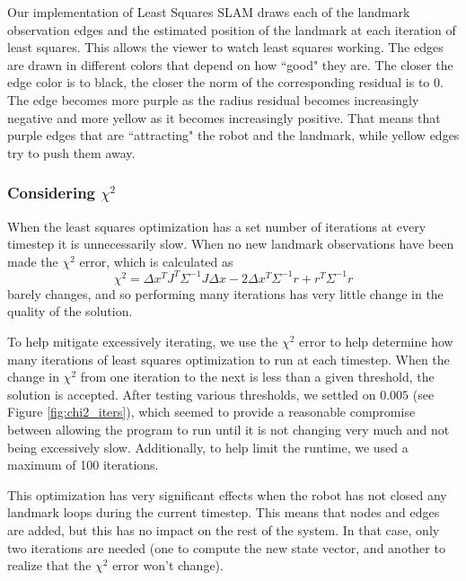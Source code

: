 \documentclass[12pt]{article}
\begin{document}
Our implementation of Least Squares SLAM draws each of the landmark observation edges and the estimated position of the landmark at each iteration of least squares.  This allows the viewer to watch least squares working. The edges are drawn in different colors that depend on how ``good" they are.  The closer the edge color is to black, the closer the norm of the corresponding residual is to 0.  The edge becomes more purple as the radius residual becomes increasingly negative and more yellow as it becomes increasingly positive. That means that purple edges that are ``attracting" the robot and the landmark, while yellow edges try to push them away.

\subsubsection*{Considering $\chi^2$}
When the least squares optimization has a set number of iterations at every timestep it is unnecessarily slow.  When no new landmark observations have been made the $\chi^2$ error, which is calculated as
$$\chi^2 = \Delta x^TJ^T\Sigma^{-1}J\Delta x - 2\Delta x^T\Sigma^{-1}r + r^T\Sigma^{-1}r$$
barely changes, and so performing many iterations has very little change in the quality of the solution.

To help mitigate excessively iterating, we use the $\chi^2$ error to help determine how many iterations of least squares optimization to run at each timestep.  When the change in $\chi^2$ from one iteration to the next is less than a given threshold, the solution is accepted.  After testing various thresholds, we settled on $0.005$ (see Figure \ref{fig:chi2_iters}), which seemed to provide a reasonable compromise between allowing the program to run until it is not changing very much and not being excessively slow.  Additionally, to help limit the runtime, we used a maximum of 100 iterations.

This optimization has very significant effects when the robot has not closed any landmark loops during the current timestep. This means that nodes and edges are added, but this has no impact on the rest of the system. In that case, only two iterations are needed (one to compute the new state vector, and another to realize that the $\chi^2$ error won't change).
\end{document}
